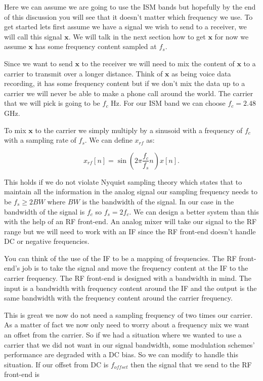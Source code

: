Here we can assume we are going to use the \ac{ISM} bands but hopefully by the end of this discussion you will see that it doesn't matter which frequency we use. To get started lets first assume we have a signal we wish to send to a receiver, we will call this signal $\mathbf{x}$. We will talk in the next section how to get $\mathbf{x}$ for now we assume $\mathbf{x}$ has some frequency content sampled at $f_s$.

Since we want to send $\mathbf{x}$ to the receiver we will need to mix the content of $\mathbf{x}$ to a carrier to transmit over a longer distance. Think of $\mathbf{x}$ as being voice data recording, it has some frequency content but if we don't mix the data up to a carrier we will never be able to make a phone call around the world. The carrier that we will pick is going to be $f_c$ \ac{Hz}. For our \ac{ISM} band we can choose $f_c = 2.48$ \ac{GHz}.

To mix $\mathbf{x}$ to the carrier we simply multiply by a sinusoid with a frequency of $f_c$ with a sampling rate of $f_s$. We can define $x_{rf}$ as:

\begin{equation}
\label{eq:mix}
x_{rf}[n] = \sin\left(2\pi\frac{f_c}{f_s}n\right)x[n].
\end{equation}	

This holds if we do not violate Nyquist sampling theory which states that to maintain all the information in the analog signal our sampling frequency needs to be $f_s \geq 2BW$ where $BW$ is the bandwidth of the signal. In our case in  the bandwidth of the signal is $f_c$ so $f_s = 2f_c$. We can design a better system than this with the help of an \ac{RF} front-end. An analog mixer will take our signal to the \ac{RF} range but we will need to work with an \ac{IF} since the \ac{RF} front-end doesn't handle \ac{DC} or negative frequencies.

You can think of the use of the \ac{IF} to be a mapping of frequencies. The \ac{RF} front-end's job is to take the signal and move the frequency content at the \ac{IF} to the carrier frequency. The \ac{RF} front-end is designed with a bandwidth in mind. The input is a bandwidth with frequency content around the \ac{IF} and the output is the same bandwidth with the frequency content around the carrier frequency.

This is great we now do not need a sampling frequency of two times our carrier. As a matter of fact we now only need to worry about a frequency mix we want an offset from the carrier. So if we had a situation where we wanted to use a carrier that we did not want in our signal bandwidth, some modulation schemes' performance are degraded with a \ac{DC} bias. So we can modify  to handle this situation. If our offset from \ac{DC} is $f_{offset}$ then the signal that we send to the \ac{RF} front-end is


